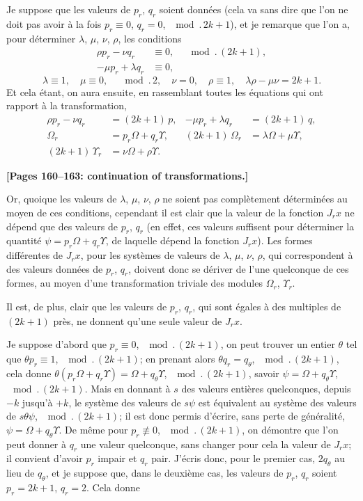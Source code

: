 \documentclass[11pt,a4paper]{book}
\begin{document}
Je suppose que les valeurs de $p_r$, $q_r$ soient donn\'ees (cela va sans
dire que l'on ne doit pas avoir \`a la fois $p_r \equiv 0$, $q_r = 0$,
$\mod.\,2k+1$), et je remarque que l'on a, pour d\'eterminer $\lambda$,
$\mu$, $\nu$, $\rho$, les conditions
\begin{align*}
\rho p_r - \nu q_r &\equiv 0, \quad \mod.\,(2k+1), \\
-\mu p_r + \lambda q_r &\equiv 0,
\end{align*}
\[
\lambda \equiv 1,\quad \mu \equiv 0, \quad \mod.\,2,\quad
\nu = 0,\quad \rho \equiv 1,\quad
\lambda\rho - \mu\nu = 2k+1.
\]
Et cela \'etant, on aura ensuite, en rassemblant toutes les \'equations qui
ont rapport \`a la transformation,
\begin{align*}
\rho p_r - \nu q_r &= (2k+1)\,p, &
-\mu p_r + \lambda q_r &= (2k+1)\,q, \\
\Omega_r &= p_r\Omega + q_r\Upsilon, &
(2k+1)\,\Omega_r &= \lambda\Omega + \mu\Upsilon, \\
(2k+1)\,\Upsilon_r &= \nu\Omega + \rho\Upsilon. &
\end{align*}

\medskip
\noindent\textbf{[Pages 160--163: continuation of transformations.]}

Or, quoique les valeurs de $\lambda$, $\mu$, $\nu$, $\rho$ ne soient pas
compl\`etement d\'etermin\'ees au moyen de ces conditions, cependant il est
clair que la valeur de la fonction $J_r x$ ne d\'epend que des valeurs de
$p_r$, $q_r$ (en effet, ces valeurs suffisent pour d\'eterminer la quantit\'e
$\psi = p_r\Omega + q_r\Upsilon$, de laquelle d\'epend la fonction $J_r x$).
Les formes diff\'erentes de $J_r x$, pour les syst\`emes de valeurs de
$\lambda$, $\mu$, $\nu$, $\rho$, qui correspondent \`a des valeurs donn\'ees de
$p_r$, $q_r$, doivent donc se d\'eriver de l'une quelconque de ces formes,
au moyen d'une transformation triviale des modules $\Omega_r$, $\Upsilon_r$.

Il est, de plus, clair que les valeurs de $p_r$, $q_r$, qui sont \'egales
\`a des multiples de $(2k+1)$ pr\`es, ne donnent qu'une seule valeur de
$J_r x$.

Je suppose d'abord que $p_r \equiv 0$, $\mod.\,(2k+1)$, on peut trouver un
entier $\theta$ tel que $\theta p_r \equiv 1$, $\mod.\,(2k+1)$; en prenant alors
$\theta q_r = q_\theta$, $\mod.\,(2k+1)$, cela donne
$\theta(p_r\Omega + q_r\Upsilon) = \Omega + q_\theta\Upsilon$,
$\mod.\,(2k+1)$, savoir $\psi = \Omega + q_\theta\Upsilon$,
$\mod.\,(2k+1)$. Mais en donnant \`a $s$ des valeurs enti\`eres quelconques,
depuis $-k$ jusqu'\`a $+k$, le syst\`eme des valeurs de $s\psi$ est
\'equivalent au syst\`eme des valeurs de $s\theta\psi$, $\mod.\,(2k+1)$; il
est donc permis d'\'ecrire, sans perte de g\'en\'eralit\'e,
$\psi = \Omega + q_\theta\Upsilon$. De m\^eme pour $p_r \not\equiv 0$,
$\mod.\,(2k+1)$, on d\'emontre que l'on peut donner \`a $q_r$ une valeur
quelconque, sans changer pour cela la valeur de $J_r x$; il convient d'avoir
$p_r$ impair et $q_r$ pair. J'\'ecris donc, pour le premier cas, $2q_\theta$
au lieu de $q_\theta$, et je suppose que, dans le deuxi\`eme cas, les valeurs
de $p_r$, $q_r$ soient $p_r = 2k+1$, $q_r = 2$. Cela donne
\end{document}
